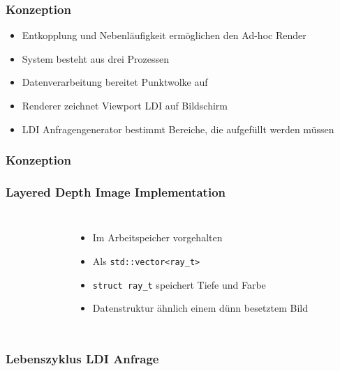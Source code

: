 \documentclass[aspectratio=169]{beamer}
\begin{document}
\begin{frame}
    \frametitle{Konzeption}
    \begin{itemize}
        \item Entkopplung und Nebenläufigkeit ermöglichen den Ad-hoc Render
        \item System besteht aus drei Prozessen
        \item Datenverarbeitung bereitet Punktwolke auf
        \item Renderer zeichnet Viewport LDI auf Bildschirm
        \item LDI Anfragengenerator bestimmt Bereiche, die aufgefüllt werden müssen
    \end{itemize}
\end{frame}

\begin{frame}
    \frametitle{Konzeption}
    \begin{figure}
        \centering
        \label{fig:sysoverview}
    \end{figure}
\end{frame}

\begin{frame}
    \frametitle{Layered Depth Image Implementation}
    \begin{columns}
        \begin{figure}
            \centering
            \resizebox{\linewidth}{!}{}%
            \label{fig:layereddepthimage}
        \end{figure}

    \begin{itemize}
        \item Im Arbeitspeicher vorgehalten
        \item Als \texttt{std::vector<ray\_t>}
        \item \texttt{struct ray\_t} speichert Tiefe und Farbe
        \item Datenstruktur ähnlich einem dünn besetztem Bild
    \end{itemize}
    \end{columns}
\end{frame}

\begin{frame}
    \frametitle{Lebenszyklus LDI Anfrage}
    \begin{figure}
        \centering
        \resizebox{.6\linewidth}{!}{}%
        \label{fig:umlquerylife}
    \end{figure}
\end{frame}
\end{document}

